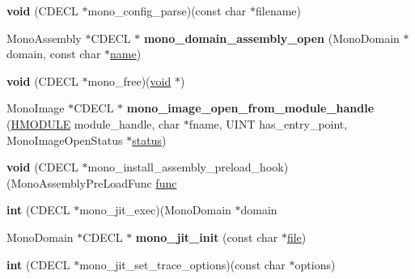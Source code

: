\begin{DoxyCompactItemize}
\item 
\mbox{\label{structloaded__mono_acdcf14f2eea7b316621511bfdbdecb55}} 
{\bfseries void} (C\+D\+E\+CL $\ast$mono\+\_\+config\+\_\+parse)(const char $\ast$filename)
\item 
\mbox{\label{structloaded__mono_ac4ec42e153b96b6611c7c85e17c7ef85}} 
Mono\+Assembly $\ast$C\+D\+E\+CL $\ast$ {\bfseries mono\+\_\+domain\+\_\+assembly\+\_\+open} (Mono\+Domain $\ast$domain, const char $\ast$\hyperlink{structname}{name})
\item 
\mbox{\label{structloaded__mono_a9461e96d2f7724decb190a4203940157}} 
{\bfseries void} (C\+D\+E\+CL $\ast$mono\+\_\+free)(\hyperlink{interfacevoid}{void} $\ast$)
\item 
\mbox{\label{structloaded__mono_aecf7ad9a6980521962d770f5fb8074af}} 
Mono\+Image $\ast$C\+D\+E\+CL $\ast$ {\bfseries mono\+\_\+image\+\_\+open\+\_\+from\+\_\+module\+\_\+handle} (\hyperlink{interfacevoid}{H\+M\+O\+D\+U\+LE} module\+\_\+handle, char $\ast$fname, U\+I\+NT has\+\_\+entry\+\_\+point, Mono\+Image\+Open\+Status $\ast$\hyperlink{structstatus}{status})
\item 
\mbox{\label{structloaded__mono_a0cd0a62ccbef8f7a8aefe1e4b49badb0}} 
{\bfseries void} (C\+D\+E\+CL $\ast$mono\+\_\+install\+\_\+assembly\+\_\+preload\+\_\+hook)(Mono\+Assembly\+Pre\+Load\+Func \hyperlink{interfacevoid}{func}
\item 
\mbox{\label{structloaded__mono_a674cfdab8c0fe54dc3a6412cdf8e4284}} 
{\bfseries int} (C\+D\+E\+CL $\ast$mono\+\_\+jit\+\_\+exec)(Mono\+Domain $\ast$domain
\item 
\mbox{\label{structloaded__mono_ae0584a6cc0b794b346a24cd441cc7443}} 
Mono\+Domain $\ast$C\+D\+E\+CL $\ast$ {\bfseries mono\+\_\+jit\+\_\+init} (const char $\ast$\hyperlink{structfile}{file})
\item 
\mbox{\label{structloaded__mono_ac6a6b365fee62d9caf2a8c4944ccf161}} 
{\bfseries int} (C\+D\+E\+CL $\ast$mono\+\_\+jit\+\_\+set\+\_\+trace\+\_\+options)(const char $\ast$options)
\item 

\end{DoxyCompactItemize}
